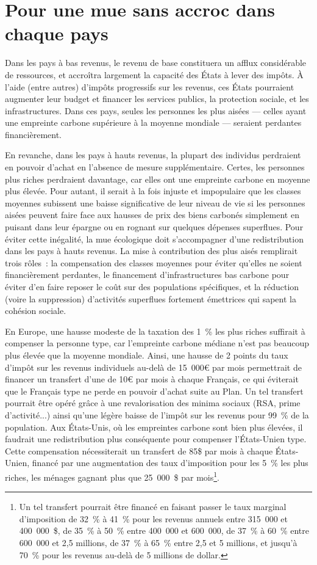 \documentclass[a5paper,french]{memoir}
\begin{document}
\section{Pour une mue sans accroc dans chaque pays}\label{sec:mue_nationale}

Dans les pays à bas revenus, le revenu de base constituera un afflux considérable de ressources, et accroîtra largement la capacité des États à lever des impôts. À l'aide (entre autres) d'impôts progressifs sur les revenus, ces États pourraient augmenter leur budget et financer les services publics, la protection sociale, et les infrastructures. Dans ces pays, seules les personnes les plus aisées --- celles ayant une empreinte carbone supérieure à la moyenne mondiale --- seraient perdantes financièrement. 

En revanche, dans les pays à hauts revenus, la plupart des individus perdraient en pouvoir d'achat en l'absence de mesure supplémentaire. Certes, les personnes plus riches perdraient davantage, car elles ont une empreinte carbone en moyenne plus élevée. Pour autant, il serait à la fois injuste et impopulaire que les classes moyennes subissent une baisse significative de leur niveau de vie si les personnes aisées peuvent faire face aux hausses de prix des biens carbonés simplement en puisant dans leur épargne ou en rognant sur quelques dépenses superflues. Pour éviter cette inégalité, la mue écologique doit s'accompagner d'une redistribution dans les pays à hauts revenus. La mise à contribution des plus aisés remplirait trois rôles~: la compensation des classes moyennes pour éviter qu'elles ne soient financièrement perdantes, le financement d'infrastructures bas carbone pour éviter d'en faire reposer le coût sur des populations spécifiques, et la réduction (voire la suppression) d'activités superflues fortement émettrices qui sapent la cohésion sociale.

En Europe, une hausse modeste de la taxation des 1~\% les plus riches suffirait à compenser la personne type, car l'empreinte carbone médiane n'est pas beaucoup plus élevée que la moyenne mondiale. Ainsi, une hausse de 2 points du taux d'impôt sur les revenus individuels au-delà de 15~000\euro{} par mois permettrait de financer un transfert d'une de 10\euro{} par mois à chaque Français, ce qui éviterait que le Français type ne perde en pouvoir d'achat suite au Plan. Un tel transfert pourrait être opéré grâce à une revalorisation des minima sociaux (RSA, prime d'activité...) ainsi qu'une légère baisse de l'impôt sur les revenus pour 99~\% de la population. Aux États-Unis, où les empreintes carbone sont bien plus élevées, il faudrait une redistribution plus conséquente pour compenser l'États-Unien type. Cette compensation nécessiterait un transfert de 85\$ par mois à chaque États-Unien, financé par une augmentation des taux d'imposition pour les 5~\% les plus riches, les ménages gagnant plus que 25~000~\$ par mois\footnote{Un tel transfert pourrait être financé en faisant passer le taux marginal d'imposition de 32~\% à 41~\% pour les revenus annuels entre 315~000 et 400~000~\$, de 35~\% à 50~\% entre 400~000 et 600~000, de 37~\% à 60~\% entre 600~000 et 2,5 millions, de 37~\% à 65~\% entre 2,5 et 5 millions, et jusqu'à 70~\% pour les revenus au-delà de 5 millions de dollar.}.
\end{document}
